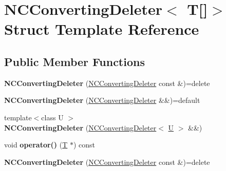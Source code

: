 \hypertarget{struct_n_c_converting_deleter_3_01_t[]_4}{}\section{N\+C\+Converting\+Deleter$<$ T\mbox{[}\mbox{]}$>$ Struct Template Reference}
\label{struct_n_c_converting_deleter_3_01_t[]_4}
\subsection*{Public Member Functions}
\begin{DoxyCompactItemize}
\item 
\mbox{\label{struct_n_c_converting_deleter_3_01_t[]_4_a0e45111d9b7fd818aab08ab107bc6edf}} 
{\bfseries N\+C\+Converting\+Deleter} (\mbox{\hyperlink{struct_n_c_converting_deleter}{N\+C\+Converting\+Deleter}} const \&)=delete
\item 
\mbox{\label{struct_n_c_converting_deleter_3_01_t[]_4_a5679c2de8d7529caf73c5f9027658f6e}} 
{\bfseries N\+C\+Converting\+Deleter} (\mbox{\hyperlink{struct_n_c_converting_deleter}{N\+C\+Converting\+Deleter}} \&\&)=default
\item 
\mbox{\label{struct_n_c_converting_deleter_3_01_t[]_4_aec19330560f43e6aa09ddab776ede544}} 
{\footnotesize template$<$class U $>$ }\\{\bfseries N\+C\+Converting\+Deleter} (\mbox{\hyperlink{struct_n_c_converting_deleter}{N\+C\+Converting\+Deleter}}$<$ \mbox{\hyperlink{union_u}{U}} $>$ \&\&)
\item 
\mbox{\label{struct_n_c_converting_deleter_3_01_t[]_4_ab753b1278ee31d806af4177d4e87bc70}} 
void {\bfseries operator()} (\mbox{\hyperlink{struct_t}{T}} $\ast$) const
\item 
\mbox{\label{struct_n_c_converting_deleter_3_01_t[]_4_a0e45111d9b7fd818aab08ab107bc6edf}} 
{\bfseries N\+C\+Converting\+Deleter} (\mbox{\hyperlink{struct_n_c_converting_deleter}{N\+C\+Converting\+Deleter}} const \&)=delete
\item 
\mbox{\label{struct_n_c_converting_deleter_3_01_t[]_4_a5679c2de8d7529caf73c5f9027658f6e}} 

\end{DoxyCompactItemize}
